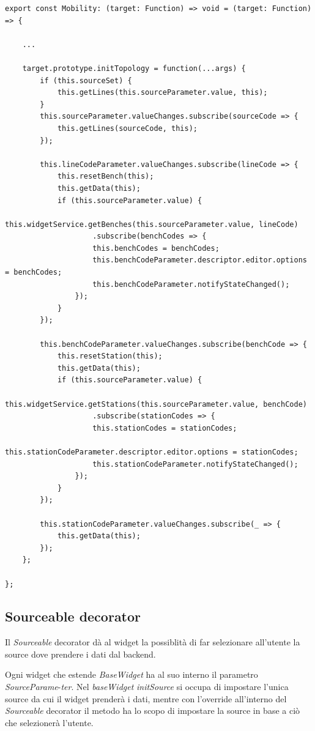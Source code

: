\begin{lstlisting}[caption={Decorator Mobility, metodo initTopology}, style=javaScriptCode]
export const Mobility: (target: Function) => void = (target: Function) => {

    ...

    target.prototype.initTopology = function(...args) {
        if (this.sourceSet) {
            this.getLines(this.sourceParameter.value, this);
        }
        this.sourceParameter.valueChanges.subscribe(sourceCode => {
            this.getLines(sourceCode, this);
        });

        this.lineCodeParameter.valueChanges.subscribe(lineCode => {
            this.resetBench(this);
            this.getData(this);
            if (this.sourceParameter.value) {
                this.widgetService.getBenches(this.sourceParameter.value, lineCode)
                    .subscribe(benchCodes => {
                    this.benchCodes = benchCodes;
                    this.benchCodeParameter.descriptor.editor.options = benchCodes;
                    this.benchCodeParameter.notifyStateChanged();
                });
            }
        });

        this.benchCodeParameter.valueChanges.subscribe(benchCode => {
            this.resetStation(this);
            this.getData(this);
            if (this.sourceParameter.value) {
                this.widgetService.getStations(this.sourceParameter.value, benchCode)
                    .subscribe(stationCodes => {
                    this.stationCodes = stationCodes;
                    this.stationCodeParameter.descriptor.editor.options = stationCodes;
                    this.stationCodeParameter.notifyStateChanged();
                });
            }
        });

        this.stationCodeParameter.valueChanges.subscribe(_ => {
            this.getData(this);
        });
    };

};
\end{lstlisting}

\subsection{Sourceable decorator}
Il \textit{Sourceable} decorator dà al widget la possiblità di far selezionare all'utente la source dove prendere i dati dal backend.

Ogni widget che estende \textit{BaseWidget} ha al suo interno il parametro \textit{SourceParame}-\textit{ter}. Nel \textit{baseWidget} \textit{initSource} si occupa di impostare l'unica source da cui il widget prenderà i dati, mentre con l'override all'interno del \textit{Sourceable} decorator il metodo ha lo scopo di impostare la source in base a ciò che selezionerà l'utente.

